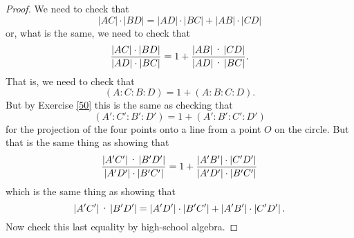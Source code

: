 \begin{proof}
We need to check that%
\[
\left\vert AC\right\vert \cdot\left\vert BD\right\vert
=\left\vert AD\right\vert \cdot\left\vert BC\right\vert
+\left\vert AB\right\vert \cdot\left\vert CD\right\vert
\]
or, what is the same, we need to check that%
\[
\frac{\left\vert AC\right\vert \cdot\left\vert
BD\right\vert }{\left\vert AD\right\vert \cdot\left\vert
BC\right\vert }=1+\frac{\left\vert AB\right\vert \text{\textperiodcentered
}\left\vert CD\right\vert }{\left\vert AD\right\vert \text{\textperiodcentered
}\left\vert BC\right\vert }.
\]
That is, we need to check that
\[
\left(  A:C:B:D\right)  =1+\left(  A:B:C:D\right)  .
\]
But by Exercise \ref{50} this is the same as checking that%
\[
\left(  A':C':B':D'\right)  =1+\left(
A':B':C':D'\right)
\]
for the projection of the four points onto a line from a point $O$ on the
circle. But that is the same thing as showing that
\[
\frac{\left\vert A'C'\right\vert \text{\textperiodcentered
}\left\vert B'D'\right\vert }{\left\vert A'D^{\prime
}\right\vert \cdot\left\vert B'C^{\prime
}\right\vert }=1+\frac{\left\vert A'B'\right\vert
\cdot\left\vert C'D'\right\vert
}{\left\vert A'D'\right\vert \cdot \left\vert B'C'\right\vert }%
\]
which is the same thing as showing that%
\[
\left\vert A'C'\right\vert \text{\textperiodcentered
}\left\vert B'D'\right\vert =\left\vert A'D^{\prime
}\right\vert \cdot\left\vert B'C^{\prime
}\right\vert +\left\vert A'B'\right\vert
\cdot\left\vert C'D'\right\vert .
\]
Now check this last equality by high-school algebra.
\end{proof}
